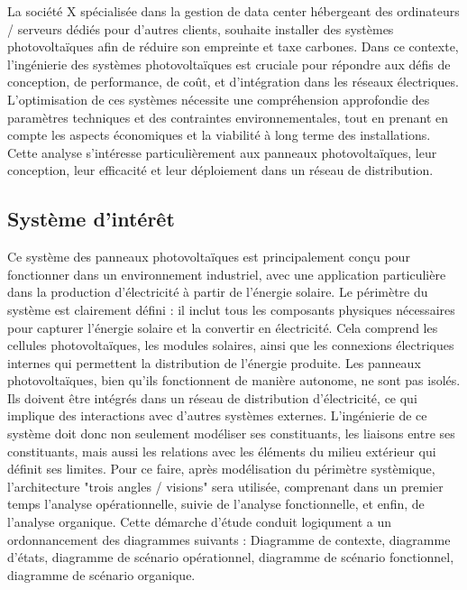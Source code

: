 \documentclass{article}
\begin{document}
La société X spécialisée dans la gestion de data center hébergeant des ordinateurs / serveurs dédiés pour d'autres clients, souhaite installer des systèmes photovoltaïques afin de réduire son empreinte et taxe carbones. Dans ce contexte, l’ingénierie des systèmes photovoltaïques est cruciale pour répondre aux défis de conception, de performance, de coût, et d’intégration dans les réseaux électriques. L’optimisation de ces systèmes nécessite une compréhension approfondie des paramètres techniques et des contraintes environnementales, tout en prenant en compte les aspects économiques et la viabilité à long terme des installations. Cette analyse s'intéresse particulièrement aux panneaux photovoltaïques, leur conception, leur efficacité et leur déploiement dans un réseau de distribution.


\subsection{Système d'intérêt}
Ce système des panneaux photovoltaïques est principalement conçu pour fonctionner dans un environnement industriel, avec une application particulière dans la production d'électricité à partir de l'énergie solaire. Le périmètre du système est clairement défini : il inclut tous les composants physiques nécessaires pour capturer l'énergie solaire et la convertir en électricité. Cela comprend les cellules photovoltaïques, les modules solaires, ainsi que les connexions électriques internes qui permettent la distribution de l'énergie produite. Les panneaux photovoltaïques, bien qu'ils fonctionnent de manière autonome, ne sont pas isolés. Ils doivent être intégrés dans un réseau de distribution d'électricité, ce qui implique des interactions avec d'autres systèmes externes. L'ingénierie de ce système doit donc non seulement modéliser ses constituants, les liaisons entre ses
constituants, mais aussi les relations avec les éléments du milieu extérieur qui définit ses limites. Pour ce faire, après modélisation du périmètre systèmique, l'architecture "trois angles / visions" sera utilisée, comprenant dans un premier temps l'analyse opérationnelle, suivie de l'analyse fonctionnelle, et enfin, de l'analyse organique. Cette démarche d'étude conduit logiqument a un ordonnancement des diagrammes suivants : Diagramme de contexte, diagramme d'états, diagramme de scénario opérationnel, diagramme de scénario fonctionnel, diagramme de scénario organique.
\end{document}
